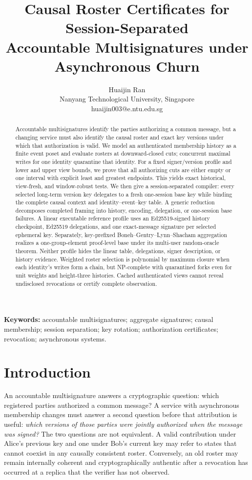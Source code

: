 \documentclass[11pt]{article}
\title{Causal Roster Certificates for Session-Separated\\Accountable Multisignatures under Asynchronous Churn}
\author{Huaijin Ran\\Nanyang Technological University, Singapore\\\textrm{huaijin003@e.ntu.edu.sg}}
\date{}
\theoremstyle{definition}
\begin{document}
\maketitle
\begin{abstract}
Accountable multisignatures identify the parties authorizing a common message, but a changing service must also identify the causal roster and exact key versions under which that authorization is valid. We model an authenticated membership history as a finite event poset and evaluate rosters at downward-closed cuts; concurrent maximal writes for one identity quarantine that identity. For a fixed signer/version profile and lower and upper view bounds, we prove that all authorizing cuts are either empty or one interval with explicit least and greatest endpoints. This yields exact historical, view-fresh, and window-robust tests. We then give a session-separated compiler: every selected long-term version key delegates to a fresh one-session base key while binding the complete causal context and identity--event--key table. A generic reduction decomposes completed framing into history, encoding, delegation, or one-session base failures. A linear executable reference profile uses an Ed25519-signed history checkpoint, Ed25519 delegations, and one exact-message signature per selected ephemeral key. Separately, key-prefixed Boneh--Gentry--Lynn--Shacham aggregation realizes a one-group-element proof-level base under its multi-user random-oracle theorem. Neither profile hides the linear table, delegations, signer description, or history evidence. Weighted roster selection is polynomial by maximum closure when each identity's writes form a chain, but NP-complete with quarantined forks even for unit weights and height-three histories. Cached authenticated views cannot reveal undisclosed revocations or certify complete observation.
\end{abstract}
\noindent\textbf{Keywords:} accountable multisignatures; aggregate signatures; causal membership; session separation; key rotation; authorization certificates; revocation; asynchronous systems.

\section{Introduction}\label{sec:intro}
An accountable multisignature answers a cryptographic question: which registered parties authorized a common message?  A service with asynchronous membership changes must answer a second question before that attribution is useful: \emph{which versions of those parties were jointly authorized when the message was signed?}  The two questions are not equivalent.  A valid contribution under Alice's previous key and one under Bob's current key may refer to states that cannot coexist in any causally consistent roster.  Conversely, an old roster may remain internally coherent and cryptographically authentic after a revocation has occurred at a replica that the verifier has not observed.
\end{document}
